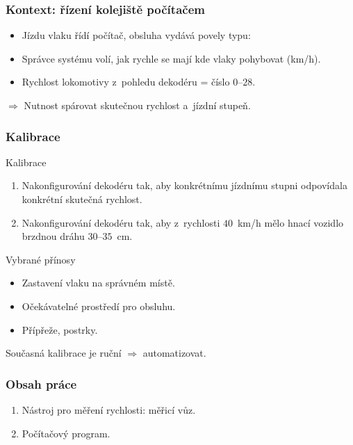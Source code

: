 \documentclass[aspectratio=169]{beamer}
\begin{document}

\begin{frame}
\frametitle{Kontext: řízení kolejiště počítačem}
\begin{itemize}
\item Jízdu vlaku řídí počítač, obsluha vydává povely typu: 
\item Správce systému volí, jak rychle se mají kde vlaky pohybovat (km/h).
\item Rychlost lokomotivy z~pohledu dekodéru = číslo $0$--$28$.
\end{itemize}
$\Rightarrow$ Nutnost spárovat skutečnou rychlost a~jízdní stupeň.
\end{frame}


\begin{frame}
\frametitle{Kalibrace}
\begin{block}{Kalibrace}
\begin{enumerate}
\item Nakonfigurování dekodéru tak, aby konkrétnímu jízdnímu stupni odpovídala
konkrétní skutečná rychlost.
\item Nakonfigurování dekodéru tak, aby z~rychlosti $40$~km/h mělo hnací vozidlo
brzdnou dráhu $30$--$35$~cm.
\end{enumerate}
\end{block}

\begin{block}{Vybrané přínosy}
\begin{itemize}
\item Zastavení vlaku na správném místě.
\item Očekávatelné prostředí pro obsluhu.
\item Přípřeže, postrky.
\end{itemize}
\end{block}

Současná kalibrace je ruční $\Rightarrow$ automatizovat.
\end{frame}


\begin{frame}
\frametitle{Obsah práce}
\begin{enumerate}
\item Nástroj pro měření rychlosti: měřicí vůz.
\item Počítačový program.
\end{enumerate}
\end{frame}
\end{document}
